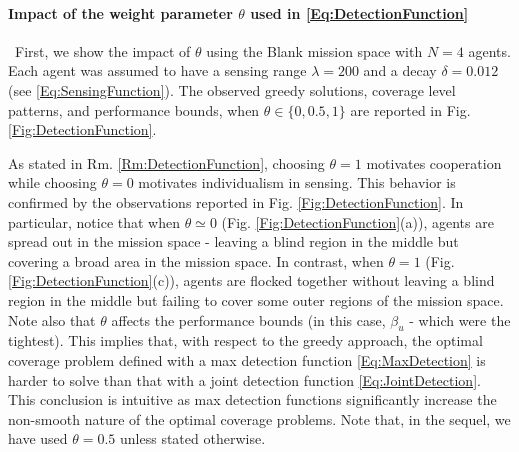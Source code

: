 \documentclass[letterpaper, 10 pt, conference]{ieeeconf}
\begin{document}

\paragraph{\textbf{Impact of the weight parameter $\theta$ used in \eqref{Eq:DetectionFunction}}}\ 
First, we show the impact of $\theta$ using the Blank mission space with $N=4$ agents. Each agent was assumed to have a sensing range $\lambda = 200$ and a decay $\delta = 0.012$ (see \eqref{Eq:SensingFunction}). The observed greedy solutions, coverage level patterns, and performance bounds, when $\theta \in \{0, 0.5, 1\}$ are reported in Fig. \ref{Fig:DetectionFunction}. 



As stated in Rm. \ref{Rm:DetectionFunction}, choosing $\theta=1$ motivates cooperation while choosing $\theta=0$ motivates individualism in sensing. This behavior is confirmed by the observations reported in Fig. \ref{Fig:DetectionFunction}. In particular, notice that when $\theta \simeq 0$ (Fig. \ref{Fig:DetectionFunction}(a)), agents are spread out in the mission space - leaving a blind region in the middle but covering a broad area in the mission space. In contrast, when $\theta=1$ (Fig. \ref{Fig:DetectionFunction}(c)), agents are flocked together without leaving a blind region in the middle but failing to cover some outer regions of the mission space. 
Note also that $\theta$ affects the performance bounds (in this case, $\beta_u$ - which were the tightest). This implies that, with respect to the greedy approach, the optimal coverage problem defined with a max detection function \eqref{Eq:MaxDetection} is harder to solve than that with a joint detection function \eqref{Eq:JointDetection}. This conclusion is intuitive as max detection functions significantly increase the non-smooth nature of the optimal coverage problems.
Note that, in the sequel, we have used $\theta=0.5$ unless stated otherwise. 


\end{document}
